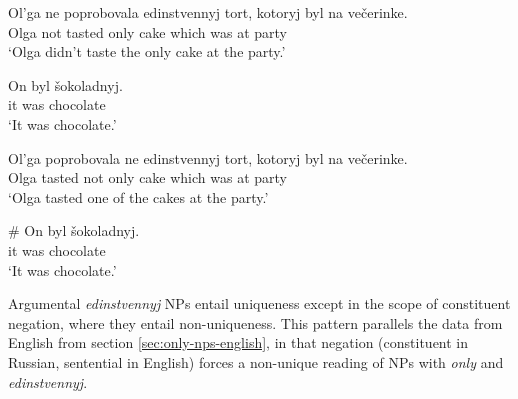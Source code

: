 \begin{exe}
	\ex \begin{xlist}
		\ex \gll Ol'ga ne poprobovala edinstvennyj tort, kotoryj byl na ve\v{c}erinke.\\
		Olga not tasted only cake which was at party\\
		\glt `Olga didn't taste the only cake at the party.'

		\ex \gll On byl \v{s}okoladnyj.\\
		it was chocolate\\
		\glt `It was chocolate.'
	\end{xlist}

	\ex \label{olga3} \begin{xlist}
		\ex \gll Ol'ga poprobovala ne edinstvennyj tort, kotoryj byl na ve\v{c}erinke.\\
		Olga tasted not only cake which was at party\\
		\glt `Olga tasted one of the cakes at the party.'

		\ex \gll \# On byl \v{s}okoladnyj.\\
		{} it was chocolate\\
		\glt `It was chocolate.'
	\end{xlist}
\end{exe}

Argumental \textit{edinstvennyj} NPs entail uniqueness except in the scope of constituent negation, where they entail non-uniqueness. This pattern parallels the data from English from section \ref{sec:only-nps-english}, in that negation (constituent in Russian, sentential in English) forces a non-unique reading of NPs with \textit{only} and \textit{edinstvennyj}.
